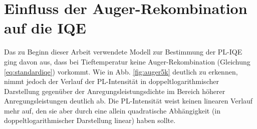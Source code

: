 
\chapter{Einfluss der Auger-Rekombination auf die IQE}
\label{chap:auger}
\thispagestyle{fancy}
Das zu Beginn dieser Arbeit verwendete Modell zur Bestimmung der PL-IQE ging davon aus, dass bei Tieftemperatur keine Auger-Rekombination (Gleichung \ref{eq:standardiqe}) vorkommt. Wie in Abb. \ref{fig:auger5k} deutlich zu erkennen, nimmt jedoch der Verlauf der PL-Intensität in doppeltlogarithmischer Darstellung gegenüber der Anregungsleistungsdichte im Bereich höherer Anregungsleistungen deutlich ab. Die PL-Intensität weist keinen linearen Verlauf mehr auf, den sie aber durch eine allein quadratische Abhängigkeit (in doppeltlogarithmischer Darstellung linear) haben sollte. 
\newline
